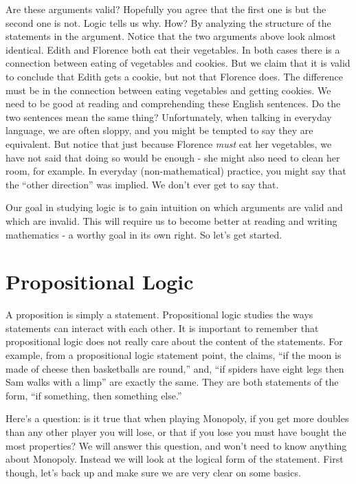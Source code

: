 \documentclass[12pt]{article}
\begin{document}
Are these arguments valid?  Hopefully you agree that the first one is but the second one is not.  Logic tells us why.  How?  By analyzing the structure of the statements in the argument.  Notice that the two arguments above look almost identical.  Edith and Florence both eat their vegetables.  In both cases there is a connection between eating of vegetables and cookies.  But we claim that it is valid to conclude that Edith gets a cookie, but not that Florence does.  The difference must be in the connection between eating vegetables and getting cookies.  We need to be good at reading and comprehending these English sentences.  Do the two sentences mean the same thing?  Unfortunately, when talking in everyday language, we are often sloppy, and you might be tempted to say they are equivalent.  But notice that just because Florence {\em must} eat her vegetables, we have not said that doing so would be enough - she might also need to clean her room, for example.  In everyday (non-mathematical) practice, you might 
say that the ``other direction'' was implied.  We don't ever get to say that.

Our goal in studying logic is to gain intuition on which arguments are valid and which are invalid.  This will require us to become better at reading and writing mathematics - a worthy goal in its own right.  So let's get started.



\section{Propositional Logic}
A proposition is simply a statement.  Propositional logic studies the ways statements can interact with each other.  It is important to remember that propositional logic does not really care about the content of the statements.  For example, from a propositional logic statement point, the claims, ``if the moon is made of cheese then basketballs are round,'' and, ``if spiders have eight legs then Sam walks with a limp'' are exactly the same.  They are both statements of the form, ``if \textlangle something\textrangle, then \textlangle something else\textrangle.''

Here's a question: is it true that when playing Monopoly, if you get more doubles than any other player you will lose, or that if you lose you must have bought the most properties?  We will answer this question, and won't need to know anything about Monopoly.  Instead we will look at the logical form of the statement.  First though, let's back up and make sure we are very clear on some basics.
\end{document}
